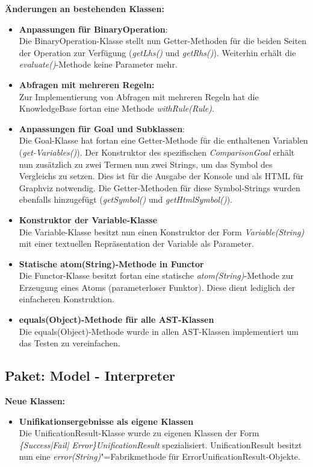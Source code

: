 \documentclass[parskip=full,11pt,twoside]{scrartcl}
\begin{document}
\textbf{Änderungen an bestehenden Klassen:}
\begin{itemize}
	\item \textbf{Anpassungen für BinaryOperation}:\\
	Die BinaryOperation-Klasse stellt nun Getter-Methoden für die beiden Seiten der Operation zur Verfügung (\textit{getLhs()} und \textit{getRhs()}). Weiterhin erhält die \textit{evaluate()}-Methode keine Parameter mehr.
	\item \textbf{Abfragen mit mehreren Regeln:}\\
	Zur Implementierung von Abfragen mit mehreren Regeln hat die KnowledgeBase fortan eine Methode \textit{withRule(Rule)}.
	\item \textbf{Anpassungen für Goal und Subklassen}:\\
	Die Goal-Klasse hat fortan eine Getter-Methode für die enthaltenen Variablen (\textit{get-Variables()}). Der Konstruktor des spezifischen \textit{ComparisonGoal} erhält nun zusätzlich zu zwei Termen nun zwei Strings, um das Symbol des Vergleichs zu setzen. Dies ist für die Ausgabe der Konsole und als HTML für Graphviz notwendig. Die Getter-Methoden für diese Symbol-Strings wurden ebenfalls hinzugefügt (\textit{getSymbol()} und \textit{getHtmlSymbol()}).
	\item \textbf{Konstruktor der Variable-Klasse}\\
	Die Variable-Klasse besitzt nun einen Konstruktor der Form \textit{Variable(String)} mit einer textuellen Repräsentation der Variable als Parameter.
	\newpage
	\item \textbf{Statische atom(String)-Methode in Functor}\\
	Die Functor-Klasse besitzt fortan eine statische \textit{atom(String)}-Methode zur Erzeugung eines Atoms (parameterloser Funktor). Diese dient lediglich der einfacheren Konstruktion.
	\item \textbf{equals(Object)-Methode für alle AST-Klassen}\\
	Die equals(Object)-Methode wurde in allen AST-Klassen implementiert um das Testen zu vereinfachen.
\end{itemize}

\subsection{Paket: Model - Interpreter}

\textbf{Neue Klassen:}
\begin{itemize}
	\item \textbf{Unifikationsergebnisse als eigene Klassen}\\
	Die UnificationResult-Klasse wurde zu eigenen Klassen der Form \textit{\{Success|Fail| Error\}UnificationResult} spezialisiert. UnificationResult besitzt nun eine \textit{error(String)}"=Fabrikmethode für ErrorUnificationResult-Objekte.
\end{itemize}
\end{document}
